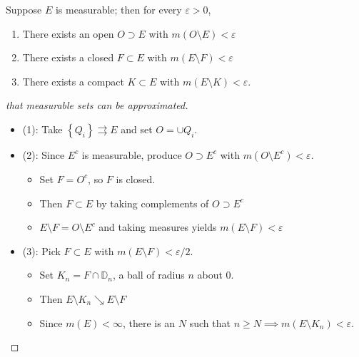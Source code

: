 \begin{theorem}

Suppose \(E\) is measurable; then for every \({\varepsilon}>0\),

\begin{enumerate}
\def\labelenumi{\arabic{enumi}.}
\tightlist
\item
  There exists an open \(O\supset E\) with
  \(m(O\setminus E) < {\varepsilon}\)
\item
  There exists a closed \(F\subset E\) with
  \(m(E\setminus F) < {\varepsilon}\)
\item
  There exists a compact \(K\subset E\) with
  \(m(E\setminus K) < {\varepsilon}\).
\end{enumerate}

\end{theorem}

\begin{proof}[that measurable sets can be approximated]

\envlist

\begin{itemize}
\tightlist
\item
  (1): Take \(\left\{{Q_{i}}\right\} \rightrightarrows E\) and set
  \(O = \cup Q_{i}\).
\item
  (2): Since \(E^c\) is measurable, produce \(O\supset E^c\) with
  \(m(O\setminus E^c) < {\varepsilon}\).

  \begin{itemize}
  \tightlist
  \item
    Set \(F = O^c\), so \(F\) is closed.
  \item
    Then \(F\subset E\) by taking complements of \(O\supset E^c\)
  \item
    \(E\setminus F = O\setminus E^c\) and taking measures yields
    \(m(E\setminus F) < {\varepsilon}\)
  \end{itemize}
\item
  (3): Pick \(F\subset E\) with \(m(E\setminus F) < {\varepsilon}/2\).

  \begin{itemize}
  \tightlist
  \item
    Set \(K_{n} = F\cap{\mathbb{D}}_{n}\), a ball of radius \(n\) about
    \(0\).
  \item
    Then \(E\setminus K_{n} \searrow E\setminus F\)
  \item
    Since \(m(E) < \infty\), there is an \(N\) such that
    \(n\geq N \implies m(E\setminus K_{n}) < {\varepsilon}\).
  \end{itemize}
\end{itemize}

\end{proof}

